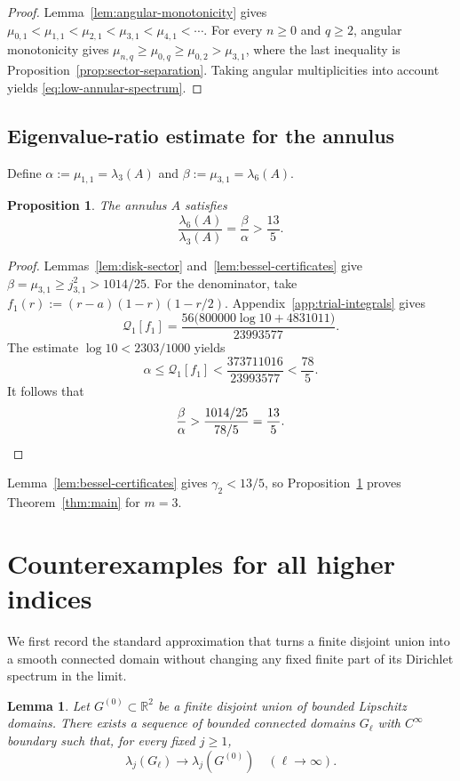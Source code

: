 \documentclass[11pt,letterpaper,reqno]{amsart}
\newtheorem{lemma}[lemma]{Lemma}
\newtheorem{proposition}[proposition]{Proposition}
\theoremstyle{definition}
\newcommand{\R}{\mathbb{R}}
\begin{document}
\begin{proof}
Lemma~\ref{lem:angular-monotonicity} gives
$\mu_{0,1}<\mu_{1,1}<\mu_{2,1}<\mu_{3,1}<\mu_{4,1}<\cdots$.  For every
$n\geq0$ and $q\geq2$, angular monotonicity gives
$\mu_{n,q}\geq\mu_{0,q}\geq\mu_{0,2}>\mu_{3,1}$, where the last inequality
is Proposition~\ref{prop:sector-separation}.  Taking angular multiplicities
into account yields \eqref{eq:low-annular-spectrum}.
\end{proof}



\subsection{Eigenvalue-ratio estimate for the annulus}

Define
$\alpha:=\mu_{1,1}=\lambda_3(A)$ and
$\beta:=\mu_{3,1}=\lambda_6(A)$.

\begin{proposition}\label{prop:annular-ratio}
The annulus $A$ satisfies
\[
 \frac{\lambda_6(A)}{\lambda_3(A)}
 =\frac{\beta}{\alpha}>\frac{13}{5}.
\]
\end{proposition}

\begin{proof}
Lemmas~\ref{lem:disk-sector} and~\ref{lem:bessel-certificates} give
$\beta=\mu_{3,1}\geq j_{3,1}^2>1014/25$.  For the denominator, take
$f_1(r):=(r-a)(1-r)(1-r/2)$.  Appendix~\ref{app:trial-integrals} gives
\[
 \mathcal{Q}_1[f_1]
 =\frac{56\bigl(800000\log 10+4831011\bigr)}{23993577}.
\]
The estimate $\log 10<2303/1000$ yields
\[
 \alpha\leq\mathcal{Q}_1[f_1]
 <\frac{373711016}{23993577}<\frac{78}{5}.
\]
It follows that
\[
 \frac{\beta}{\alpha}
 >\frac{1014/25}{78/5}=\frac{13}{5}.
\qedhere
\]
\end{proof}

Lemma~\ref{lem:bessel-certificates} gives $\gamma_2<13/5$, so
Proposition~\ref{prop:annular-ratio} proves Theorem~\ref{thm:main} for
$m=3$.

\section{Counterexamples for all higher indices}\label{sec:all-m}

We first record the standard approximation that turns a finite disjoint union
into a smooth connected domain without changing any fixed finite part of its
Dirichlet spectrum in the limit.

\begin{lemma}\label{lem:connected-approximation}
Let $G^{(0)}\subset\R^2$ be a finite disjoint union of bounded Lipschitz
domains.  There exists a sequence of bounded connected domains $G_\ell$ with
$C^\infty$ boundary such that, for every fixed $j\geq1$,
\[
 \lambda_j(G_\ell)\longrightarrow\lambda_j(G^{(0)})
 \quad(\ell\to\infty).
\]
\end{lemma}
\end{document}
